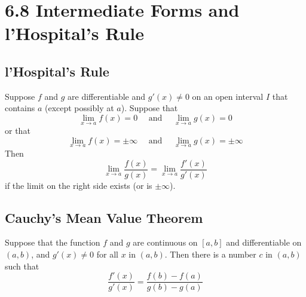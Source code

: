 %
%

\section*{6.8 Intermediate Forms and l'Hospital's Rule}

\subsection*{l'Hospital's Rule}

\begin{definition}
Suppose \(f\) and \(g\) are differentiable and \( g'(x) \neq 0 \) on an open interval \(I\) that contains \(a\) (except possibly at \(a\)). Suppose that
\[ \lim_{x \to a} f(x)=0 \quad \text{ and } \quad \lim_{x \to a} g(x)=0 \]
or that 
\[ \lim_{x \to a} f(x)= \pm \infty \quad \text{ and } \quad \lim_{x \to a} g(x) = \pm \infty \]
Then 
\[ \lim_{x \to a} \frac{f(x)}{g(x)} = \lim_{x \to a} \frac{f'(x)}{g'(x)} \]
if the limit on the right side exists (or is \( \pm \infty \)).
\end{definition}

\subsection*{Cauchy's Mean Value Theorem}

\begin{definition}
Suppose that the function \(f\) and \(g\) are continuous on \([a, b]\) and differentiable on \((a, b)\), and \(g'(x) \neq 0\) for all \(x\) in \((a, b)\). Then there is a number \(c\) in \((a, b)\) such that 
\[ \frac{f'(x)}{g'(x)}=\frac{f(b)-f(a)}{g(b)-g(a)} \]
\end{definition}
